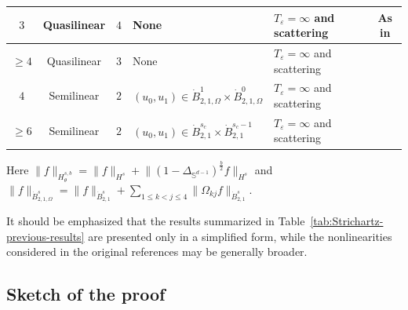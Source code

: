 \documentclass[11pt,twoside]{article}
\def\ds{\displaystyle}
\theoremstyle{plain}
\theoremstyle{definition}
\theoremstyle{assumption}
\numberwithin{equation}{section}
\begin{document}
\begin{table}[H]
\begin{tabular}{c|c|c|p{4.6cm}|p{2.5cm}|c}
			\(3\)
			&
			Quasilinear
			&
			\(4\)
			&
			None
			&
			$T_\varepsilon=\infty$ and \quad scattering
			&
			As in \cite{FangWang2013,HouYin3}
			\\
			\hline
			
			\(\ge4\)
			&
			Quasilinear
			&
			\(3\)
			&
			None
			&
			$T_\varepsilon=\infty$ and \quad scattering
			&
			\cite{HouYin3}
			\\
			\hline
			
			\(4\)
			&
			Semilinear
			&
			\(2\)
			&
			$
			(u_0,u_1)
			\in
			\dot B_{2,1,\Omega}^{1}
			\times
			\dot B_{2,1,\Omega}^{0}
			$
			&
			$T_\varepsilon=\infty$ and \quad scattering
			&
			\cite{Sterbenz2}
			
			\\
			\hline
				\(\ge 6\)
			&
			Semilinear
			&
			\(2\)
			&
			$
			(u_0,u_1)
			\in
			\dot{B}_{2,1}^{s_c}
			\times
			\dot{B}_{2,1}^{s_c-1}
			$
			&
			$T_\varepsilon=\infty$ and \quad scattering
			&
			\cite{Sterbenz1}
			\\
			\hline
			
		\end{tabular}
	\end{table}
	
	Here $\|f\|_{H_\theta^{s,b}}
	=\|f\|_{H^s}+
	\big\|
	(1-\Delta_{\mathbb{S}^{d-1}})^{\frac b2}f
	\big\|_{H^s}$ and $\|f\|_{\dot B_{2,1,\Omega}^{s}}
	=\|f\|_{\dot B_{2,1}^{s}}+
	\ds\sum_{1\le k<j\le4}
	\|\Omega_{kj}f\|_{\dot B_{2,1}^{s}}$.
	
	It should be emphasized that the results summarized in
	Table~\ref{tab:Strichartz-previous-results} are presented only in a simplified
	form, while the nonlinearities considered in the original references may be generally broader.
		
	
	
	
	
	\subsection{Sketch of the proof}
	
\end{document}
